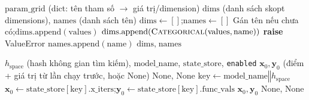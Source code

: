 \documentclass[12pt,a4paper]{article}
\begin{document}
\begin{algorithm}[H]
\caption{Chuyển đổi không gian tìm kiếm sang định dạng skopt (\textsc{ConvertSearchSpace})}
\label{alg:bo_convert}
\begin{algorithmic}[1]
\Require $\text{param\_grid}$ (dict: tên tham số $\rightarrow$ giá trị/dimension)
\Ensure $\text{dims}$ (danh sách skopt dimensions), $\text{names}$ (danh sách tên)
\State $\text{dims} \gets []$;\quad $\text{names} \gets []$
        \State Gán tên nếu chưa có;\quad $\text{dims}.\text{append}(\text{values})$
        \State $\text{dims}.\text{append}(\textsc{Categorical}(\text{values}, \text{name}))$
    \Else
        \State \textbf{raise} ValueError 
    \EndIf
    \State $\text{names}.\text{append}(\text{name})$
\EndFor
\State \Return $\text{dims},\; \text{names}$
\end{algorithmic}
\end{algorithm}

\begin{algorithm}[H]
\caption{Tải trạng thái optimizer cho warm start (\textsc{LoadOptimizerState})}
\label{alg:bo_warmstart}
\begin{algorithmic}[1]
\Require $h_{\text{space}}$ (hash không gian tìm kiếm), $\text{model\_name}$, $\text{state\_store}$, \texttt{enabled}
\Ensure $\mathbf{x}_0, \mathbf{y}_0$ (điểm + giá trị từ lần chạy trước, hoặc None)
    \State \Return None, None
\EndIf
\State $\text{key} \gets \text{model\_name} \mathbin{\Vert} h_{\text{space}}$
    \State $\mathbf{x}_0 \gets \text{state\_store}[\text{key}].\text{x\_iters}$;\quad $\mathbf{y}_0 \gets \text{state\_store}[\text{key}].\text{func\_vals}$
        \State \Return $\mathbf{x}_0, \mathbf{y}_0$ 
    \EndIf
\EndIf
\State \Return None, None
\end{algorithmic}
\end{algorithm}
\end{document}
